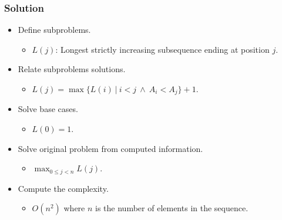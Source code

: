 \documentclass{beamer}
\begin{document}
\begin{frame}%
\frametitle{Solution}


\begin{itemize}

\item Define subproblems.
\begin{itemize}
\item<1-> $L(j)$: Longest strictly increasing subsequence ending at position $j$.
\end{itemize}

\vspace{0.2cm}

\item<2-> Relate subproblems solutions.
\begin{itemize}
\item<2-> $L(j) = \max \{ L(i)\ |\ i < j\ \wedge\ A_i < A_j \} + 1$.
\end{itemize}

\vspace{0.2cm}

\item<3-> Solve base cases.
\begin{itemize}
\item<3-> $L(0) = 1$.
\end{itemize}

\vspace{0.2cm}

\item<4-> Solve original problem from computed information.
\begin{itemize}
\item<4-> $\displaystyle\max_{0\le j < n} L(j)$.
\end{itemize}

\vspace{0.2cm}

\item<5-> Compute the complexity.
\begin{itemize}
\item<5> $O(n^2)$ where $n$ is the number of elements in the sequence.
\end{itemize}

\end{itemize}

\end{frame}
\end{document}
